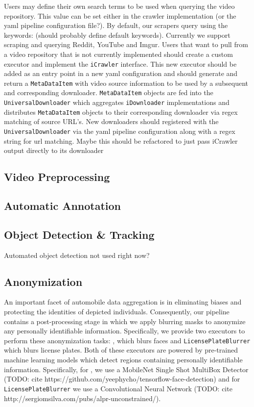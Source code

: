 \documentclass[letterpaper, 10 pt, conference]{IEEEconf}
\newcommand{\todo}[1]{{\color{red}#1}}
\begin{document}
Users may define their own search terms to be used when querying the video repository. This value can be set either in the crawler implementation (\todo{or the yaml pipeline configuration file?}). By default, our scrapers query using the keywords: (\todo{should probably define default keywords}). Currently we support scraping and querying Reddit, YouTube and Imgur. Users that want to pull from a video repository that is not currently implemented should create a custom executor and implement the \texttt{iCrawler} interface. This new executor should be added as an entry point in a new yaml configuration and should generate and return a \texttt{MetaDataItem} with video source information to be used by a subsequent and corresponding downloader. \texttt{MetaDataItem} objects are fed into the \texttt{UniversalDownloader} which aggregates \texttt{iDownloader} implementations and distributes \texttt{MetaDataItem} objects to their corresponding downloader via regex matching of source URL's. New downloaders should registered with the \texttt{UniversalDownloader} via the yaml pipeline configuration along with a regex string for url matching.  \todo{Maybe this should be refactored to just pass iCrawler output directly to its downloader}

\subsection{Video Preprocessing}



\subsection{Automatic Annotation}
\subsection{Object Detection \& Tracking}
\todo{Automated object detection not used right now?}
\subsection{Anonymization}
An important facet of automobile data aggregation is in eliminating biases and protecting the identities of depicted individuals. Consequently, our pipeline contains a post-processing stage in which we apply blurring masks to anonymize any personally identifiable information. Specifically, we provide two executors to perform these anonymization tasks: , which blurs faces and \texttt{LicensePlateBlurrer} which blurs license plates. Both of these executors are powered by pre-trained machine learning models which detect regions containing personally identifiable information. Specifically, for  , we use a MobileNet Single Shot MultiBox Detector (TODO: cite https://github.com/yeephycho/tensorflow-face-detection) and for \texttt{LicensePlateBlurrer} we use a Convolutional Neural Network (TODO: cite http://sergiomsilva.com/pubs/alpr-unconstrained/).
\end{document}
